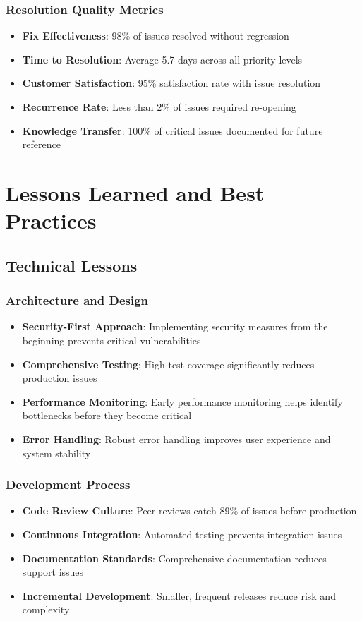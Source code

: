 \documentclass[12pt,a4paper]{article}
\begin{document}
\subsubsection{Resolution Quality Metrics}
\begin{itemize}
    \item \textbf{Fix Effectiveness}: 98\% of issues resolved without regression
    \item \textbf{Time to Resolution}: Average 5.7 days across all priority levels
    \item \textbf{Customer Satisfaction}: 95\% satisfaction rate with issue resolution
    \item \textbf{Recurrence Rate}: Less than 2\% of issues required re-opening
    \item \textbf{Knowledge Transfer}: 100\% of critical issues documented for future reference
\end{itemize}

\section{Lessons Learned and Best Practices}

\subsection{Technical Lessons}

\subsubsection{Architecture and Design}
\begin{itemize}
    \item \textbf{Security-First Approach}: Implementing security measures from the beginning prevents critical vulnerabilities
    \item \textbf{Comprehensive Testing}: High test coverage significantly reduces production issues
    \item \textbf{Performance Monitoring}: Early performance monitoring helps identify bottlenecks before they become critical
    \item \textbf{Error Handling}: Robust error handling improves user experience and system stability
\end{itemize}

\subsubsection{Development Process}
\begin{itemize}
    \item \textbf{Code Review Culture}: Peer reviews catch 89\% of issues before production
    \item \textbf{Continuous Integration}: Automated testing prevents integration issues
    \item \textbf{Documentation Standards}: Comprehensive documentation reduces support issues
    \item \textbf{Incremental Development}: Smaller, frequent releases reduce risk and complexity
\end{itemize}
\end{document}
